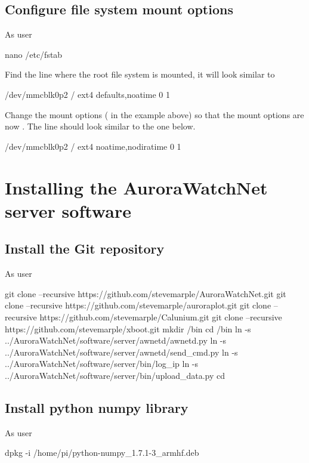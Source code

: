 \subsection{Configure file system mount options}

As user \rootUser
\begin{Cmd}
nano /etc/fstab  
\end{Cmd}

Find the line where the root file system is mounted, it will look
similar to
\begin{Cmd}
/dev/mmcblk0p2  /               ext4    defaults,noatime  0       1
\end{Cmd}
Change the mount options ( in the example
above) so that the mount options are now
. The line should look similar to the one
below.
\begin{Cmd}
/dev/mmcblk0p2  /               ext4    noatime,nodiratime  0       1
\end{Cmd}





\section{Installing the AuroraWatchNet server software}

\subsection{Install the Git repository}
As user \piUser
\begin{Cmd}
git clone --recursive https://github.com/stevemarple/AuroraWatchNet.git 
git clone --recursive https://github.com/stevemarple/auroraplot.git
git clone --recursive https://github.com/stevemarple/Calunium.git
git clone --recursive https://github.com/stevemarple/xboot.git
mkdir \mytilde/bin
cd \mytilde/bin
ln -s ../AuroraWatchNet/software/server/awnetd/awnetd.py
ln -s ../AuroraWatchNet/software/server/awnetd/send_cmd.py
ln -s ../AuroraWatchNet/software/server/bin/log_ip
ln -s ../AuroraWatchNet/software/server/bin/upload_data.py
cd \mytilde
\end{Cmd}

\subsection{Install python numpy library}

As user \rootUser
\begin{Cmd}
dpkg -i /home/pi/python-numpy_1.7.1-3_armhf.deb
\end{Cmd}

